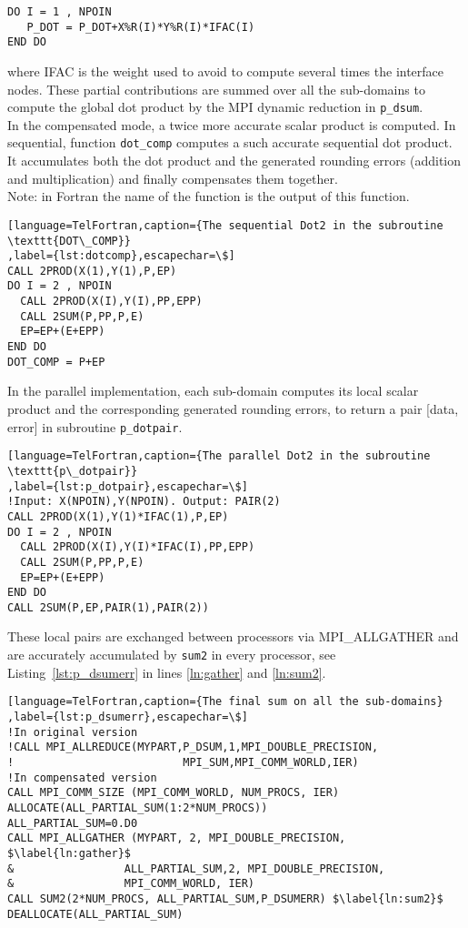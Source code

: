 \begin{lstlisting}[language=TelFortran,numbers=none,frame=none,escapechar=\$]
DO I = 1 , NPOIN
   P_DOT = P_DOT+X%R(I)*Y%R(I)*IFAC(I)
END DO
\end{lstlisting}
%
where IFAC is the weight used to avoid to compute several times the interface nodes.
These partial contributions are summed over all the sub-domains to compute 
the global dot product by the MPI dynamic reduction in \texttt{p\_dsum}.\\
%
In the compensated mode, a twice more accurate scalar product is
computed.
In sequential, function \texttt{dot\_comp} computes a such
accurate sequential dot product. 
It accumulates both the dot product and the generated rounding 
errors (addition and multiplication) and finally compensates them together. \\                                                        
Note: in Fortran the name of the function is the 
output of this function.
\begin{lstlisting}[language=TelFortran,caption={The sequential Dot2 in the subroutine \texttt{DOT\_COMP}}
,label={lst:dotcomp},escapechar=\$]
CALL 2PROD(X(1),Y(1),P,EP)
DO I = 2 , NPOIN
  CALL 2PROD(X(I),Y(I),PP,EPP)
  CALL 2SUM(P,PP,P,E)
  EP=EP+(E+EPP)
END DO
DOT_COMP = P+EP
\end{lstlisting}
%
In the parallel implementation, each sub-domain computes its
local scalar product and the corresponding generated rounding
errors, to return a pair [data, error] in subroutine \texttt{p\_dotpair}. 
%
\begin{lstlisting}[language=TelFortran,caption={The parallel Dot2 in the subroutine \texttt{p\_dotpair}}
,label={lst:p_dotpair},escapechar=\$]
!Input: X(NPOIN),Y(NPOIN). Output: PAIR(2) 
CALL 2PROD(X(1),Y(1)*IFAC(1),P,EP)
DO I = 2 , NPOIN
  CALL 2PROD(X(I),Y(I)*IFAC(I),PP,EPP)
  CALL 2SUM(P,PP,P,E)
  EP=EP+(E+EPP)
END DO
CALL 2SUM(P,EP,PAIR(1),PAIR(2))
\end{lstlisting}
%
These local pairs are exchanged between processors
via MPI\_ALLGATHER and are accurately accumulated by \texttt{sum2}
in every processor, see Listing~\ref{lst:p_dsumerr} in lines 
\ref{ln:gather} and \ref{ln:sum2}.
%
\begin{lstlisting}[language=TelFortran,caption={The final sum on all the sub-domains}
,label={lst:p_dsumerr},escapechar=\$]
!In original version
!CALL MPI_ALLREDUCE(MYPART,P_DSUM,1,MPI_DOUBLE_PRECISION,
!                          MPI_SUM,MPI_COMM_WORLD,IER)
!In compensated version
CALL MPI_COMM_SIZE (MPI_COMM_WORLD, NUM_PROCS, IER)
ALLOCATE(ALL_PARTIAL_SUM(1:2*NUM_PROCS))
ALL_PARTIAL_SUM=0.D0
CALL MPI_ALLGATHER (MYPART, 2, MPI_DOUBLE_PRECISION, $\label{ln:gather}$
&                 ALL_PARTIAL_SUM,2, MPI_DOUBLE_PRECISION, 
&                 MPI_COMM_WORLD, IER)
CALL SUM2(2*NUM_PROCS, ALL_PARTIAL_SUM,P_DSUMERR) $\label{ln:sum2}$
DEALLOCATE(ALL_PARTIAL_SUM)
\end{lstlisting}

